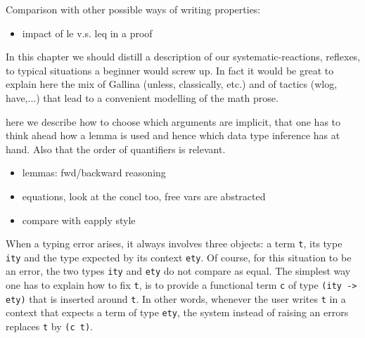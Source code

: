 Comparison with other possible ways of writing properties:
\begin{itemize}
\item impact of le v.s. leq in a proof
\end{itemize}

In this chapter we should distill a description of our
systematic-reactions, reflexes, to typical situations a
beginner would screw up. In fact it would be great to explain here the
mix of Gallina (unless, classically, etc.) and of tactics (wlog,
have,...) that lead to a convenient modelling of the math prose.
\label{sec:declaringimpl}

here we describe how to choose which arguments are implicit,
that one has to think ahead how  a lemma is used and hence
which data type inference has at hand.  Also that the order
of quantifiers is relevant.
\begin{itemize}
\item lemmas: fwd/backward reasoning
\item equations, look at the concl too, free vars are abstracted
\item compare with eapply style
\end{itemize}

\mcbREQUIRE{}
\mcbPROVIDE{}


When a typing error arises, it always involves three objects:
a term \lstinline/t/, its type \lstinline/ity/ and the type
expected by its context \lstinline/ety/.  Of course, for this
situation to be an error, the two types \lstinline/ity/ and
\lstinline/ety/ do not compare as equal.
The simplest way one has to explain \Coq{} how to fix \lstinline/t/,
is to provide a functional term \lstinline/c/ of type
\lstinline/(ity -> ety)/ that is inserted around \lstinline/t/.
In other words, whenever the user writes \lstinline/t/ in a context
that expects a term of type \lstinline/ety/, the system instead of
raising an errors replaces \lstinline/t/ by \lstinline/(c t)/.

